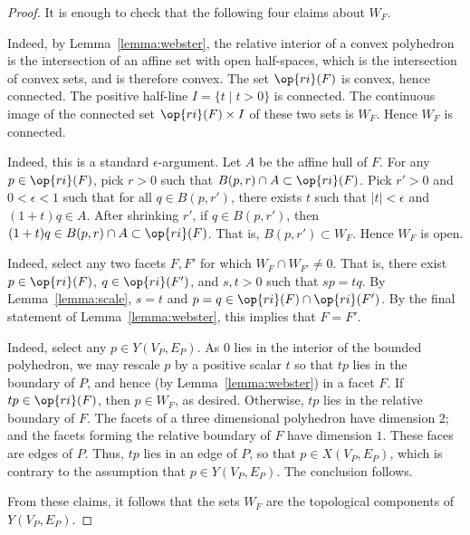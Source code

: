 \begin{proof} It is enough to check that the following four claims about  $W_F$.

 Indeed, by Lemma~\ref{lemma:webster}, the relative interior of a convex polyhedron is the intersection of an affine set with open half-spaces, which is the intersection of convex sets, and is therefore convex. The set $\op{ri}(F)$ is convex, hence connected.    The positive half-line $I=\{t\mid t>0\}$ is connected.  The continuous image of the connected set $\op{ri}(F)\times I$ of these two sets is $W_F$.  Hence $W_F$ is connected.

  Indeed, this is a standard $\epsilon$-argument.  Let $A$ be the affine hull of $F$.  For any $p\in \op{ri}(F)$, pick $r>0$ such that $B(p,r)\cap A\subset \op{ri}(F)$.  Pick $r'>0$ and $0<\epsilon<1$ such that for all $q\in B(p,r')$, there exists $t$ such that $|t|<\epsilon$ and $(1+t)q\in A$.  After shrinking $r'$,  if $q\in B(p,r')$, then $(1+t)q \in B(p,r)\cap A \subset \op{ri}(F)$.   That is, $B(p,r')\subset W_F$.  Hence $W_F$ is open.

  Indeed, select any two facets $F,F'$ for which $W_F\cap W_{F'}\ne 0$.  That is, there exist $p\in \op{ri}(F)$, $q\in \op{ri}(F')$, and $s,t>0$ such that
$s p = t q$.  By Lemma~\ref{lemma:scale}, $s=t$ and $p=q\in \op{ri}(F)\cap \op{ri}(F')$.  By the final statement of Lemma~\ref{lemma:webster}, this implies that $F=F'$.

  Indeed, select any $p\in Y(V_P,E_P)$.  As $0$ lies in the interior of the bounded polyhedron, we may rescale $p$ by a positive scalar $t$ so that $t p$ lies in the boundary of $P$, and hence (by Lemma~\ref{lemma:webster}) in a facet $F$.  If $t p \in \op{ri}(F)$, then $p\in W_F$, as desired.  Otherwise, $t p$ lies in the relative boundary of $F$.  The facets of a three dimensional polyhedron have dimension $2$; and the facets forming the relative boundary of $F$ have dimension $1$.  These faces are edges of $P$.  Thus, $t p$ lies in an edge of $P$, so that $p\in X(V_P,E_P)$, which is contrary to the assumption that $p\in Y(V_P,E_P)$.  The conclusion follows.

From these claims, it follows that the sets $W_F$ are the topological components of $Y(V_P,E_P)$.
\end{proof}
%

